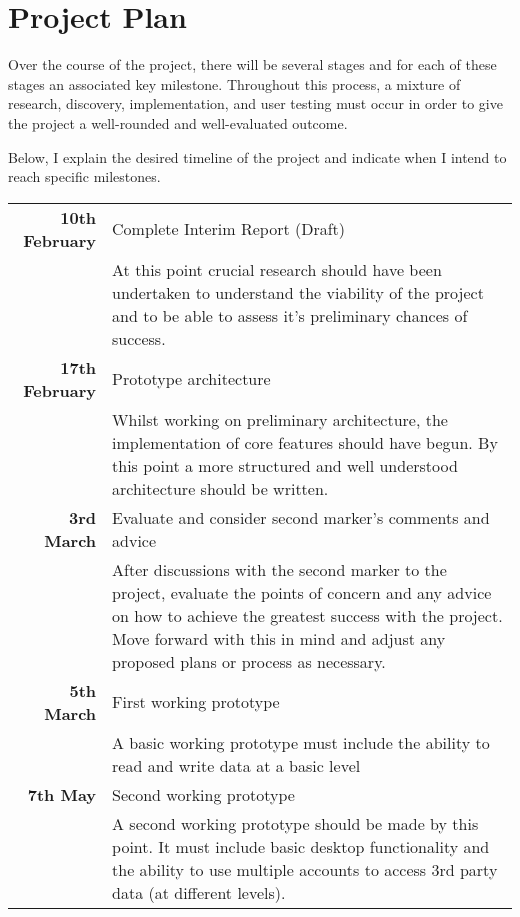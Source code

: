 \section{Project Plan}

Over the course of the project, there will be several stages and for each of these stages an associated key milestone. Throughout this process, a mixture of research, discovery, implementation, and user testing must occur in order to give the project a well-rounded and well-evaluated outcome.

Below, I explain the desired timeline of the project and indicate when I intend to reach specific milestones.

\vspace{5 mm}
\begin{table}[!h]
  \centering
  \begin{tabularx}{0.9\textwidth}{ r | X }
    \textbf{10th February} & Complete Interim Report (Draft) \\
                           & At this point crucial research should have been undertaken to understand the viability of the project and to be able to assess it's preliminary chances of success. \\
                           [4ex]
    \textbf{17th February} & Prototype architecture \\
                           & Whilst working on preliminary architecture, the implementation of core features should have begun. By this point a more structured and well understood architecture should be written. \\
                           [4ex]
    \textbf{3rd March}     & Evaluate and consider second marker's comments
                           and advice \\
                           & After discussions with the second marker to the project, evaluate the points of concern and any advice on how to achieve the greatest success with the project. Move forward with this in mind and adjust any proposed plans or process as necessary. \\
                           [4ex]
    \textbf{5th March}     & First working prototype \\
                           & A basic working prototype must include the ability to read and write data at a basic level \\
                           [4ex]
    \textbf{7th May}       & Second working prototype \\
                           & A second working prototype should be made by this point. It must include basic desktop functionality and the ability to use multiple accounts to access 3rd party data (at different levels). \\

\end{tabularx}
\end{table}
